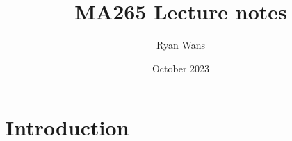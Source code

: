 \documentclass{article}
\title{MA265 Lecture notes}
\author{Ryan Wans}
\date{October 2023}
\begin{document}
\maketitle

\section{Introduction}
\end{document}
